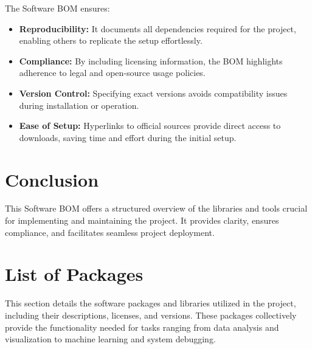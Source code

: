 The Software BOM ensures:
\begin{itemize}
	\item \textbf{Reproducibility:} It documents all dependencies required for the project, enabling others to replicate the setup effortlessly.
	\item \textbf{Compliance:} By including licensing information, the BOM highlights adherence to legal and open-source usage policies.
	\item \textbf{Version Control:} Specifying exact versions avoids compatibility issues during installation or operation.
	\item \textbf{Ease of Setup:} Hyperlinks to official sources provide direct access to downloads, saving time and effort during the initial setup.
\end{itemize}

\section{Conclusion}

This Software BOM offers a structured overview of the libraries and tools crucial for implementing and maintaining the project. It provides clarity, ensures compliance, and facilitates seamless project deployment.



\section{List of Packages}

This section details the software packages and libraries utilized in the project, including their descriptions, licenses, and versions. These packages collectively provide the functionality needed for tasks ranging from data analysis and visualization to machine learning and system debugging.


